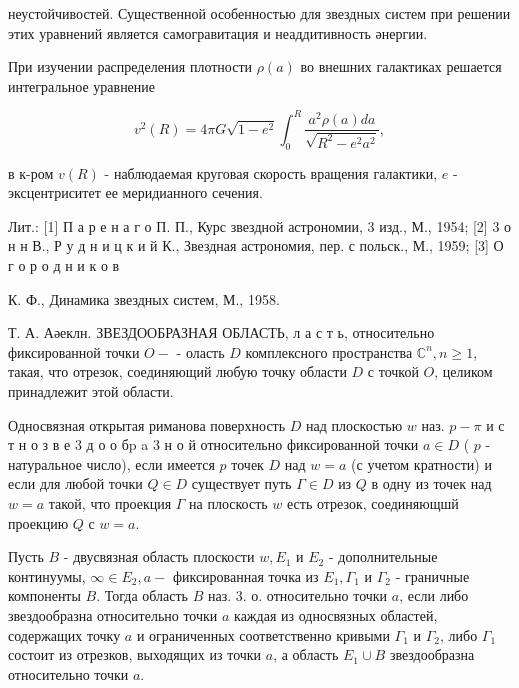 \documentclass[10pt]{article}
\begin{document}
неустойчивостей. Существенной особенностью для звездных систем при решении этих уравнений является самогравитация и неаддитивность әнергии.



При изучении распределения плотности $\rho(a)$ во внешних галактиках решается интегральное уравнение



\[

v^{2}(R)=4 \pi G \sqrt{1-e^{2}} \int_{0}^{R} \frac{a^{2} \rho(a) d a}{\sqrt{R^{2}-e^{2} a^{2}}},

\]



в к-ром $v(R)$ - наблюдаемая круговая скорость вращения галактики, $e$ - эксцентриситет ее меридианного сечения.



Лит.: [1] П а р е н а г о П. П., Курс звездной астрономии, 3 изд., М., 1954; [2] 3 о н н В., Р у д н и ц к и й К., Звездная астрономия, пер. с польск., М., 1959; [3] О г о р о д н и к о в

К. Ф., Динамика звездных систем, М., 1958.

Т. А. Аәеклн. ЗВЕЗДООБРАЗНАЯ ОБЛАСТЬ, л а с т ь, относительно фиксированной точки $O-$ - оласть $D$ комплексного пространства $\mathbb{C}^{n}, n \geqslant 1$, такая, что отрезок, соединяющий любую точку области $D$ с точкой $O$, целиком принадлежит этой области.



Односвязная открытая риманова поверхность $D$ над плоскостью $w$ наз. $p-\pi$ и с т н о з в е 3 д о о бp a 3 н о й относительно фиксированной точки $a \in D$ ( $p$ - натуральное число), если имеется $p$ точек $D$ над $w=a$ (с учетом кратности) и если для любой точки $Q \in D$ существует путь $\Gamma \in D$ из $Q$ в одну из точек над $w=a$ такой, что проекция $\Gamma$ на плоскость $w$ есть отрезок, соединяющшй проекцию $Q$ с $w=a$.



Пусть $B$ - двусвязная область плоскости $w, E_{1}$ и $E_{2}$ - дополнительные континуумы, $\infty \in E_{2}, a-$ фиксированная точка из $E_{1}, \Gamma_{1}$ и $\Gamma_{2}$ - граничные компоненты $B$. Тогда область $B$ наз. 3. о. относительно точки $a$, если либо звездообразна относительно точки $a$ каждая из односвязных областей, содержащих точку $a$ и ограниченных соответственно кривыми $\Gamma_{1}$ и $\Gamma_{2}$, либо $\Gamma_{1}$ состоит из отрезков, выходящих из точки $a$, а область $E_{1} \cup B$ звездообразна относительно точки $a$.
\end{document}
